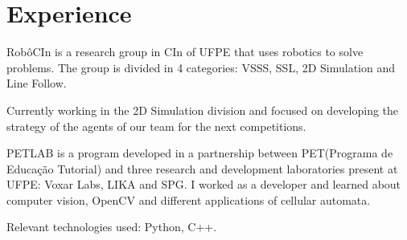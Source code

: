 \documentclass[]{deedy-resume-openfont}
\begin{document}
\begin{minipage}[t]{0.33\textwidth}
\sectionsep



%
%

\end{minipage} 
\hfill
\begin{minipage}[t]{0.66\textwidth} 


\section{Experience}

\vspace{\topsep} %
\begin{tightemize}
\item RobôCIn is a research group in CIn of UFPE that uses robotics to solve problems. The group is divided in 4 categories: VSSS, SSL, 2D Simulation and Line Follow.
\item Currently working in the 2D Simulation division and focused on developing the strategy of the agents of our team for the next competitions.
\end{tightemize}


\begin{tightemize}
\item PETLAB is a program developed in a partnership between PET(Programa de Educação Tutorial) and
 three research and development laboratories present at UFPE: Voxar Labs, LIKA and SPG. I worked as a developer and learned about computer vision, OpenCV and  different applications of cellular automata.
\item Relevant technologies used: Python, C++.
\end{tightemize}


\end{minipage}
\end{document}
